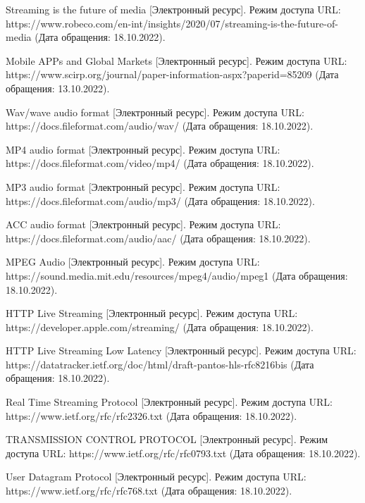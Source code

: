 \begingroup
\renewcommand{\section}[2]{}
\begin{thebibliography}{}
	
	Streaming is the future of media [Электронный ресурс].
	Режим доступа URL: https://www.robeco.com/en-int/insights/2020/07/streaming-is-the-future-of-media (Дата обращения: 18.10.2022).

	Mobile APPs and Global Markets [Электронный ресурс].
	Режим доступа URL: https://www.scirp.org/journal/paper-information-aspx?paperid=85209 (Дата обращения: 13.10.2022).

	Wav/wave audio format [Электронный ресурс].
	Режим доступа URL: https://docs.fileformat.com/audio/wav/ (Дата обращения: 18.10.2022).

	MP4 audio format [Электронный ресурс].
	Режим доступа URL: https://docs.fileformat.com/video/mp4/ (Дата обращения: 18.10.2022).

	MP3 audio format [Электронный ресурс].
	Режим доступа URL: https://docs.fileformat.com/audio/mp3/ (Дата обращения: 18.10.2022).

	ACC audio format [Электронный ресурс].
	Режим доступа URL: https://docs.fileformat.com/audio/aac/ (Дата обращения: 18.10.2022).

	MPEG Audio [Электронный ресурс].
	Режим доступа URL: https://sound.media.mit.edu/resources/mpeg4/audio/mpeg1 (Дата обращения: 18.10.2022).
	
	HTTP Live Streaming [Электронный ресурс].
	Режим доступа URL: https://developer.apple.com/streaming/ (Дата обращения: 18.10.2022).

	HTTP Live Streaming Low Latency [Электронный ресурс].
	Режим доступа URL: https://datatracker.ietf.org/doc/html/draft-pantos-hls-rfc8216bis (Дата обращения: 18.10.2022).
	
	Real Time Streaming Protocol [Электронный ресурс].
	Режим доступа URL: https://www.ietf.org/rfc/rfc2326.txt (Дата обращения: 18.10.2022).

	TRANSMISSION CONTROL PROTOCOL [Электронный ресурс].
	Режим доступа URL: https://www.ietf.org/rfc/rfc0793.txt (Дата обращения: 18.10.2022).

	User Datagram Protocol [Электронный ресурс].
	Режим доступа URL: https://www.ietf.org/rfc/rfc768.txt (Дата обращения: 18.10.2022).


\end{thebibliography}
